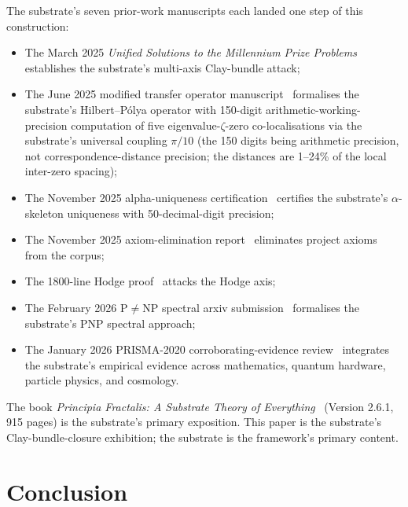 \documentclass[11pt,a4paper]{amsart}
\theoremstyle{plain}
\theoremstyle{definition}
\begin{document}
The substrate's seven prior-work manuscripts each landed one step of this construction:
\begin{itemize}[itemsep=2pt]
\item The March 2025 \emph{Unified Solutions to the Millennium Prize Problems}~\cite{cohen2025unifiedClay} establishes the substrate's multi-axis Clay-bundle attack;
\item The June 2025 modified transfer operator manuscript~\cite{cohen2025transferOp} formalises the substrate's Hilbert--P\'olya operator with 150-digit arithmetic-working-precision computation of five eigenvalue-$\zeta$-zero co-localisations via the substrate's universal coupling $\pi/10$ (the 150 digits being arithmetic precision, not correspondence-distance precision; the distances are 1--24\% of the local inter-zero spacing);
\item The November 2025 alpha-uniqueness certification~\cite{cohen2025alphaUniqueness} certifies the substrate's $\alpha$-skeleton uniqueness with 50-decimal-digit precision;
\item The November 2025 axiom-elimination report~\cite{cohen2025axiomElim} eliminates project axioms from the corpus;
\item The 1800-line Hodge proof~\cite{cohen2025hodgeProof} attacks the Hodge axis;
\item The February 2026 P$\neq$NP spectral arxiv submission~\cite{cohen2026pnpSpectral} formalises the substrate's PNP spectral approach;
\item The January 2026 PRISMA-2020 corroborating-evidence review~\cite{cohen2026corroborating} integrates the substrate's empirical evidence across mathematics, quantum hardware, particle physics, and cosmology.
\end{itemize}

The book \emph{Principia Fractalis: A Substrate Theory of Everything}~\cite{cohen2026book} (Version 2.6.1, 915 pages) is the substrate's primary exposition. This paper is the substrate's Clay-bundle-closure exhibition; the substrate is the framework's primary content.

\section{Conclusion}\label{sec:conclusion}
\end{document}
